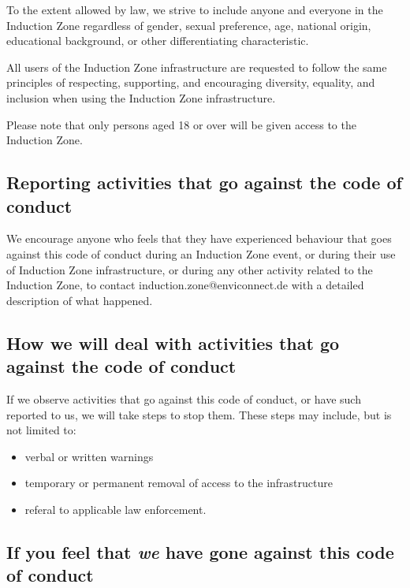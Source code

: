 \documentclass[
  10pt,
  a4paper,
]{article}
\providecommand{\tightlist}{%
  \setlength{\itemsep}{0pt}\setlength{\parskip}{0pt}}
\begin{document}
To the extent allowed by law, we strive to include anyone and everyone
in the Induction Zone regardless of gender, sexual preference, age,
national origin, educational background, or other differentiating
characteristic.

All users of the Induction Zone infrastructure are requested to follow
the same principles of respecting, supporting, and encouraging
diversity, equality, and inclusion when using the Induction Zone
infrastructure.

Please note that only persons aged 18 or over will be given access to
the Induction Zone.

\hypertarget{reporting-activities-that-go-against-the-code-of-conduct}{%
\subsection{Reporting activities that go against the code of
conduct}\label{reporting-activities-that-go-against-the-code-of-conduct}}

We encourage anyone who feels that they have experienced behaviour that
goes against this code of conduct during an Induction Zone event, or
during their use of Induction Zone infrastructure, or during any other
activity related to the Induction Zone, to contact
induction.zone@enviconnect.de with a detailed description of what
happened.

\hypertarget{how-we-will-deal-with-activities-that-go-against-the-code-of-conduct}{%
\subsection{How we will deal with activities that go against the code of
conduct}\label{how-we-will-deal-with-activities-that-go-against-the-code-of-conduct}}

If we observe activities that go against this code of conduct, or have
such reported to us, we will take steps to stop them. These steps may
include, but is not limited to:

\begin{itemize}
\tightlist
\item
  verbal or written warnings
\item
  temporary or permanent removal of access to the infrastructure
\item
  referal to applicable law enforcement.
\end{itemize}

\hypertarget{if-you-feel-that-we-have-gone-against-this-code-of-conduct}{%
\subsection{\texorpdfstring{If you feel that \emph{we} have gone against
this code of
conduct}{If you feel that we have gone against this code of conduct}}\label{if-you-feel-that-we-have-gone-against-this-code-of-conduct}}
\end{document}
